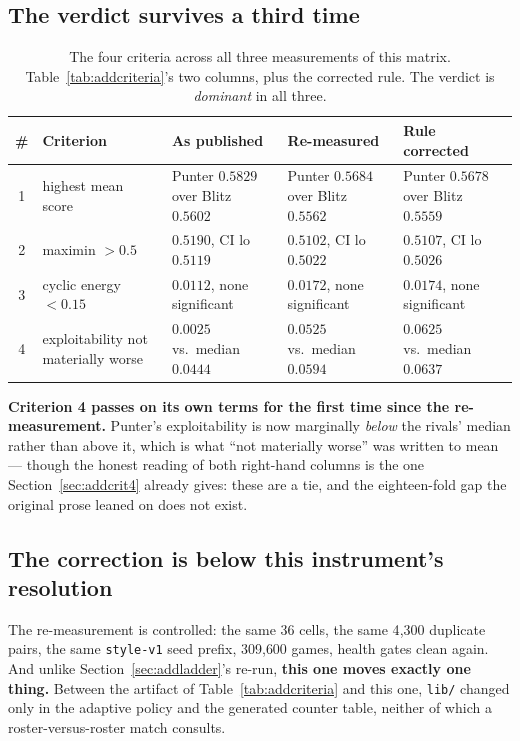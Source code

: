 \documentclass[11pt]{article}
\newcommand{\code}[1]{\texttt{#1}}
\begin{document}
\subsection{The verdict survives a third time}

\begin{table}[t]
\centering
\caption{The four criteria across all three measurements of this matrix. Table~\ref{tab:addcriteria}'s
two columns, plus the corrected rule. The verdict is \emph{dominant} in all three.}
\label{tab:addturnpasscrit}
\small
\begin{tabular}{@{}clp{3.4cm}p{3.4cm}p{3.4cm}@{}}
\toprule
\# & Criterion & As published & Re-measured & Rule corrected \\
\midrule
1 & highest mean score & Punter $0.5829$ over Blitz $0.5602$ &
    Punter $0.5684$ over Blitz $0.5562$ &
    Punter $0.5678$ over Blitz $0.5559$ \\
2 & maximin $> 0.5$ & $0.5190$, CI lo $0.5119$ &
    $0.5102$, CI lo $0.5022$ &
    $0.5107$, CI lo $0.5026$ \\
3 & cyclic energy $< 0.15$ & $0.0112$, none significant &
    $0.0172$, none significant &
    $0.0174$, none significant \\
4 & exploitability not materially worse & $0.0025$ vs.\ median $0.0444$ &
    $0.0525$ vs.\ median $0.0594$ &
    $0.0625$ vs.\ median $0.0637$ \\
\bottomrule
\end{tabular}
\end{table}

\textbf{Criterion 4 passes on its own terms for the first time since the re-measurement.} Punter's
exploitability is now marginally \emph{below} the rivals' median rather than above it, which is
what \textquotedblleft{}not materially worse\textquotedblright{} was written to mean --- though the honest reading of both right-hand
columns is the one Section~\ref{sec:addcrit4} already gives: these are a tie, and the eighteen-fold
gap the original prose leaned on does not exist.

\subsection{The correction is below this instrument's resolution}

The re-measurement is controlled: the same 36 cells, the same 4{,}300 duplicate pairs, the same
\code{style-v1} seed prefix, 309{,}600 games, health gates clean again. And unlike
Section~\ref{sec:addladder}'s re-run, \textbf{this one moves exactly one thing.} Between the
artifact of Table~\ref{tab:addcriteria} and this one, \code{lib/} changed only in the adaptive
policy and the generated counter table, neither of which a roster-versus-roster match consults.
\end{document}
